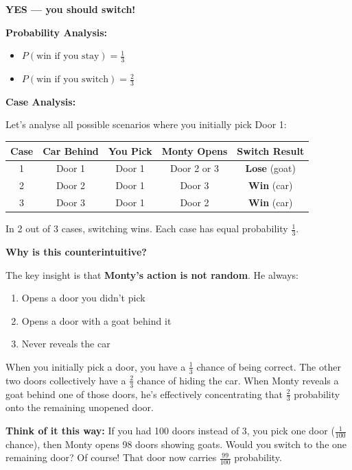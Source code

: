 \documentclass[11pt,a4paper]{article}
\begin{document}
\begin{answer}
\textbf{YES — you should switch!}

\vspace{0.3cm}
\textbf{Probability Analysis:}
\begin{itemize}
    \item $P(\text{win if you stay}) = \frac{1}{3}$
    \item $P(\text{win if you switch}) = \frac{2}{3}$
\end{itemize}

\vspace{0.3cm}
\textbf{Case Analysis:}

Let's analyse all possible scenarios where you initially pick Door 1:

\begin{center}
\begin{tabular}{|c|c|c|c|c|}
\hline
\textbf{Case} & \textbf{Car Behind} & \textbf{You Pick} & \textbf{Monty Opens} & \textbf{Switch Result} \\
\hline
1 & Door 1 & Door 1 & Door 2 or 3 & \textbf{Lose} (goat) \\
\hline
2 & Door 2 & Door 1 & Door 3 & \textbf{Win} (car) \\
\hline
3 & Door 3 & Door 1 & Door 2 & \textbf{Win} (car) \\
\hline
\end{tabular}
\end{center}

\vspace{0.3cm}
In 2 out of 3 cases, switching wins. Each case has equal probability $\frac{1}{3}$.

\vspace{0.3cm}
\textbf{Why is this counterintuitive?}

The key insight is that \textbf{Monty's action is not random}. He always:
\begin{enumerate}
    \item Opens a door you didn't pick
    \item Opens a door with a goat behind it
    \item Never reveals the car
\end{enumerate}

When you initially pick a door, you have a $\frac{1}{3}$ chance of being correct. The other two doors collectively have a $\frac{2}{3}$ chance of hiding the car. When Monty reveals a goat behind one of those doors, he's effectively concentrating that $\frac{2}{3}$ probability onto the remaining unopened door.

\vspace{0.3cm}
\textbf{Think of it this way:} If you had 100 doors instead of 3, you pick one door ($\frac{1}{100}$ chance), then Monty opens 98 doors showing goats. Would you switch to the one remaining door? Of course! That door now carries $\frac{99}{100}$ probability.
\end{answer}
\end{document}
